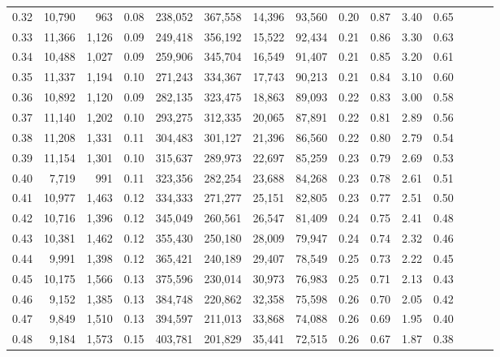 \begin{tabular}{rrrrrrrrrrrrrrr}
0.32 &  10,790 &    963 &  0.08 &  238,052 &  367,558 &   14,396 &   93,560 &  0.20 &  0.87 &  3.40 &      0.65 \\
0.33 &  11,366 &  1,126 &  0.09 &  249,418 &  356,192 &   15,522 &   92,434 &  0.21 &  0.86 &  3.30 &      0.63 \\
0.34 &  10,488 &  1,027 &  0.09 &  259,906 &  345,704 &   16,549 &   91,407 &  0.21 &  0.85 &  3.20 &      0.61 \\
0.35 &  11,337 &  1,194 &  0.10 &  271,243 &  334,367 &   17,743 &   90,213 &  0.21 &  0.84 &  3.10 &      0.60 \\
0.36 &  10,892 &  1,120 &  0.09 &  282,135 &  323,475 &   18,863 &   89,093 &  0.22 &  0.83 &  3.00 &      0.58 \\
0.37 &  11,140 &  1,202 &  0.10 &  293,275 &  312,335 &   20,065 &   87,891 &  0.22 &  0.81 &  2.89 &      0.56 \\
0.38 &  11,208 &  1,331 &  0.11 &  304,483 &  301,127 &   21,396 &   86,560 &  0.22 &  0.80 &  2.79 &      0.54 \\
0.39 &  11,154 &  1,301 &  0.10 &  315,637 &  289,973 &   22,697 &   85,259 &  0.23 &  0.79 &  2.69 &      0.53 \\
0.40 &   7,719 &    991 &  0.11 &  323,356 &  282,254 &   23,688 &   84,268 &  0.23 &  0.78 &  2.61 &      0.51 \\
0.41 &  10,977 &  1,463 &  0.12 &  334,333 &  271,277 &   25,151 &   82,805 &  0.23 &  0.77 &  2.51 &      0.50 \\
0.42 &  10,716 &  1,396 &  0.12 &  345,049 &  260,561 &   26,547 &   81,409 &  0.24 &  0.75 &  2.41 &      0.48 \\
0.43 &  10,381 &  1,462 &  0.12 &  355,430 &  250,180 &   28,009 &   79,947 &  0.24 &  0.74 &  2.32 &      0.46 \\
0.44 &   9,991 &  1,398 &  0.12 &  365,421 &  240,189 &   29,407 &   78,549 &  0.25 &  0.73 &  2.22 &      0.45 \\
0.45 &  10,175 &  1,566 &  0.13 &  375,596 &  230,014 &   30,973 &   76,983 &  0.25 &  0.71 &  2.13 &      0.43 \\
0.46 &   9,152 &  1,385 &  0.13 &  384,748 &  220,862 &   32,358 &   75,598 &  0.26 &  0.70 &  2.05 &      0.42 \\
0.47 &   9,849 &  1,510 &  0.13 &  394,597 &  211,013 &   33,868 &   74,088 &  0.26 &  0.69 &  1.95 &      0.40 \\
0.48 &   9,184 &  1,573 &  0.15 &  403,781 &  201,829 &   35,441 &   72,515 &  0.26 &  0.67 &  1.87 &      0.38 \\

\end{tabular}
